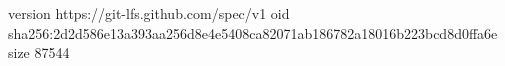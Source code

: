 version https://git-lfs.github.com/spec/v1
oid sha256:2d2d586e13a393aa256d8e4e5408ca82071ab186782a18016b223bcd8d0ffa6e
size 87544
